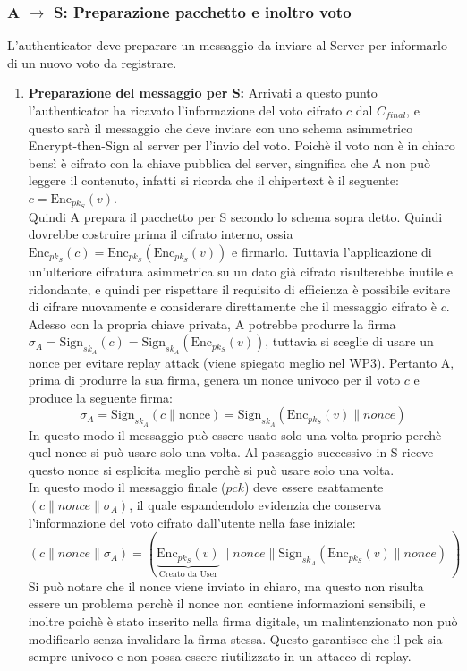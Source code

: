 	\subsubsection{A $\to$ S: Preparazione pacchetto e inoltro voto}
		L'authenticator deve preparare un messaggio da inviare al Server per informarlo di un nuovo voto da registrare.
		\begin{enumerate}
			\item \textbf{Preparazione del messaggio per S:} Arrivati a questo punto l'authenticator ha ricavato l'informazione del voto cifrato $c$ dal $C_{final}$, e questo sarà il messaggio che deve inviare con uno schema asimmetrico Encrypt-then-Sign al server per l'invio del voto. Poichè il voto non è in chiaro bensì è cifrato con la chiave pubblica del server, singnifica che A non può leggere il contenuto, infatti si ricorda che il chipertext è il seguente: $c=\text{Enc}_{pk_S}(v)$.\\
			Quindi A prepara il pacchetto per S secondo lo schema sopra detto. Quindi dovrebbe costruire prima il cifrato interno, ossia $ \text{Enc}_{pk_S}(c) = \text{Enc}_{pk_S}(\text{Enc}_{pk_S}(v)) $ e firmarlo. Tuttavia l'applicazione di un'ulteriore cifratura asimmetrica su un dato già cifrato risulterebbe inutile e ridondante, e quindi per rispettare il requisito di efficienza è possibile evitare di cifrare nuovamente e considerare direttamente che il messaggio cifrato è $c$.\\
			Adesso con la propria chiave privata, A potrebbe produrre la firma $ \sigma_{A}=\text{Sign}_{sk_A}(c) =  \text{Sign}_{sk_A}(\text{Enc}_{pk_S}(v)) $, tuttavia si sceglie di usare un nonce per evitare replay attack (viene spiegato meglio nel WP3). Pertanto A, prima di produrre la sua firma, genera un nonce univoco per il voto $c$ e produce la seguente firma:
			$$ \sigma_{A} = \text{Sign}_{sk_A}(c \| \text{nonce}) = \text{Sign}_{sk_A}(\text{Enc}_{pk_S}(v) \| nonce) $$
			In questo modo il messaggio può essere usato solo una volta proprio perchè quel nonce si può usare solo una volta. Al passaggio successivo in S riceve questo nonce si esplicita meglio perchè si può usare solo una volta.\\
			In questo modo il messaggio finale ($pck$) deve essere esattamente $(c \| nonce\| \sigma_{A})$, il quale espandendolo evidenzia che conserva l'informazione del voto cifrato dall'utente nella fase iniziale:
			$$ \boxed{(c\| nonce \| \sigma_{A})} = (\underbrace{ \text{Enc}_{pk_S}(v)}_{\text{Creato da User}}\| nonce \|  \text{Sign}_{sk_A}(\text{Enc}_{pk_S}(v)\| nonce)\ )$$
			Si può notare che il nonce viene inviato in chiaro, ma questo non risulta essere un problema perchè il nonce non contiene informazioni sensibili, e inoltre poichè è stato inserito nella firma digitale, un malintenzionato non può modificarlo senza invalidare la firma stessa. Questo garantisce che il pck sia sempre univoco e non possa essere riutilizzato in un attacco di replay.
			

\end{enumerate}
